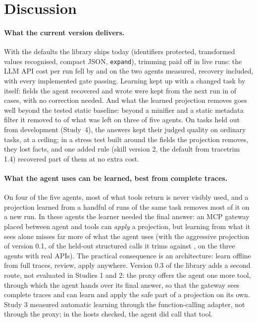 \section{Discussion}
\label{sec:discussion}

\paragraph{What the current version delivers.} With the defaults the library ships today (identifiers protected,
transformed values recognised, compact JSON, \texttt{expand}), trimming paid off in live runs: the LLM API cost per
run fell by \SthreeEOneTrimCosti{} and \SthreeEOneTrimCostiv{} on the two agents measured, recovery included, with
every implemented gate passing. Learning kept up with a changed task by itself: fields the agent recovered and wrote
were kept from the next run in \SthreeHFiveKept{} of \SthreeHFiveRecoveries{} cases, with no correction needed. And
what the learned projection removes goes well beyond the tested static baseline: beyond a minifier and a static
metadata filter it removed \BaseLearnedStaticBigMin{} to \BaseLearnedStaticBigMax{} of what was left on three of five agents.
On tasks held out from development (Study~4), the answers kept their judged quality on ordinary tasks, at a
ceiling; in a stress test built around the fields the projection removes, they lost facts, and one added rule
(skill version 2, the default from tracetrim 1.4) recovered part of them at no extra cost.

\paragraph{What the agent uses can be learned, best from complete traces.} On four of the five agents, most of what
tools return is never visibly used, and a projection learned from a handful of runs of the same task removes most
of it on a new run. In these agents the learner needed the final answer: an MCP gateway placed between agent and tools can
\emph{apply} a projection, but learning from what it sees alone misses far more of what the agent uses
(with the aggressive projection of version 0.1, \MissesPooledShareRealCalls{} of the held-out structured calls it
trims against \MissesPooledShareRealFull, on the three agents with real APIs). The practical
consequence is an architecture: learn offline from full traces, review, apply anywhere. Version 0.3 of the library
adds a second route, not evaluated in Studies 1 and 2: the proxy offers the agent one more tool, through
which the agent hands over its final answer, so that the gateway sees complete traces and can learn and apply the
safe part of a projection on its own. Study 3 measured automatic learning through the function-calling adapter,
not through the proxy; in the hosts checked, the agent did call that tool.


